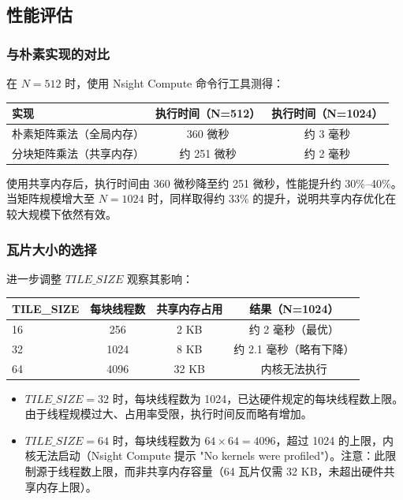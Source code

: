 \subsection{性能评估}

\subsubsection{与朴素实现的对比}

在 $N = 512$ 时，使用 Nsight Compute 命令行工具测得：

\begin{center}
\begin{tabular}{|l|c|c|}
\hline
\textbf{实现} & \textbf{执行时间（N=512）} & \textbf{执行时间（N=1024）} \\
\hline
朴素矩阵乘法（全局内存） & 360 微秒 & 约 3 毫秒 \\
\hline
分块矩阵乘法（共享内存） & 约 251 微秒 & 约 2 毫秒 \\
\hline
\end{tabular}
\end{center}

使用共享内存后，执行时间由 360 微秒降至约 251 微秒，性能提升约 30\%--40\%。当矩阵规模增大至 $N = 1024$ 时，同样取得约 33\% 的提升，说明共享内存优化在较大规模下依然有效。

\subsubsection{瓦片大小的选择}

进一步调整 $TILE\_SIZE$ 观察其影响：

\begin{center}
\begin{tabular}{|l|c|c|c|}
\hline
\textbf{TILE\_SIZE} & \textbf{每块线程数} & \textbf{共享内存占用} & \textbf{结果（N=1024）} \\
\hline
16 & 256 & 2 KB & 约 2 毫秒（最优） \\
\hline
32 & 1024 & 8 KB & 约 2.1 毫秒（略有下降） \\
\hline
64 & 4096 & 32 KB & 内核无法执行 \\
\hline
\end{tabular}
\end{center}

\begin{itemize}
    \item $TILE\_SIZE = 32$ 时，每块线程数为 1024，已达硬件规定的每块线程数上限。由于线程规模过大、占用率受限，执行时间反而略有增加。
    \item $TILE\_SIZE = 64$ 时，每块线程数为 $64 \times 64 = 4096$，超过 1024 的上限，内核无法启动（Nsight Compute 提示 "No kernels were profiled"）。注意：此限制源于线程数上限，而非共享内存容量（64 瓦片仅需 32 KB，未超出硬件共享内存上限）。
\end{itemize}


